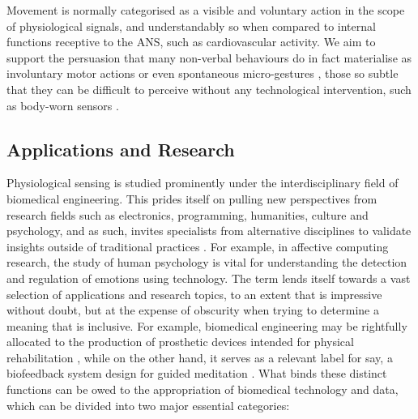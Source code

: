 Movement is normally categorised as a visible and voluntary action in the scope of physiological signals, and understandably so when compared to internal functions receptive to the ANS, such as cardiovascular activity. We aim to support the persuasion that many non-verbal behaviours do in fact materialise as involuntary motor actions \cite{haueisen_involuntary_2001} or even spontaneous micro-gestures \cite{chen_analyze_2019}, those so subtle that they can be difficult to perceive without any technological intervention, such as body-worn sensors \cite{jensenius_exploring_2017}.




\subsection*{Applications and Research}

Physiological sensing is studied prominently under the interdisciplinary field of biomedical engineering. This prides itself on pulling new perspectives from research fields such as electronics, programming, humanities, culture and psychology, and as such, invites specialists from alternative disciplines to validate insights outside of traditional practices \cite{enderle_introduction_2012}. For example, in affective computing research, the study of human psychology is vital for understanding the detection and regulation of emotions using technology. The term lends itself towards a vast selection of applications and research topics, to an extent that is impressive without doubt, but at the expense of obscurity when trying to determine a meaning that is inclusive. For example, biomedical engineering may be rightfully allocated to the production of prosthetic devices intended for physical rehabilitation \cite{valentinuzzi_physical_2019}, while on the other hand, it serves as a relevant label for say, a biofeedback system design for guided meditation \cite{foo_soft_2020}. What binds these distinct functions can be owed to the appropriation of biomedical technology and data, which can be divided into two major essential categories:

